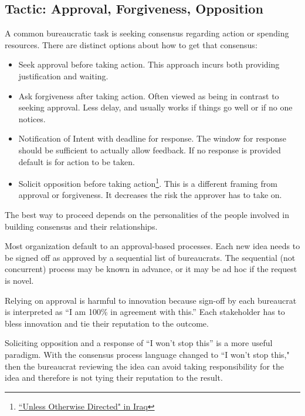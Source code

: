 \subsection*{Tactic: Approval, Forgiveness, Opposition\label{sec:approval-forgiveness-opposition}}

A common bureaucratic task is seeking consensus regarding action or spending resources. There are distinct options about how to get that consensus:
\begin{itemize}
    \item Seek approval before taking action. This approach incurs both providing justification and waiting.
    \item Ask forgiveness after taking action. Often viewed as being in contrast to seeking approval. Less delay, and usually works if things go well or if no one notices. 
    \item Notification of Intent with deadline for response. The window for response should be sufficient to actually allow feedback. If no response is provided default is for action to be taken.
    \item Solicit opposition before taking action\footnote{\href{https://www.dailykos.com/stories/2009/2/11/696188/-}{``Unless Otherwise Directed" in Iraq}}. This is a different framing from approval or forgiveness. It decreases the risk the approver has to take on.
\end{itemize}
The best way to proceed depends on the personalities of the people involved in building consensus and their relationships. 

Most organization default to an approval-based  processes. Each new idea needs to be signed off as approved by a sequential list of \glspl{bureaucrat}. The sequential (not concurrent) process may be known in advance, or it may be ad hoc if the request is novel.

Relying on approval is harmful to innovation because sign-off by each bureaucrat is interpreted as ``I am 100\% in agreement with this.'' Each stakeholder has to bless innovation and tie their reputation to the outcome.

Soliciting opposition and a response of ``I won't stop this'' is a more useful paradigm. With the consensus process language changed to ``I won't stop this," then the bureaucrat reviewing the idea can avoid taking responsibility for the idea and therefore is not tying their reputation to the result.

